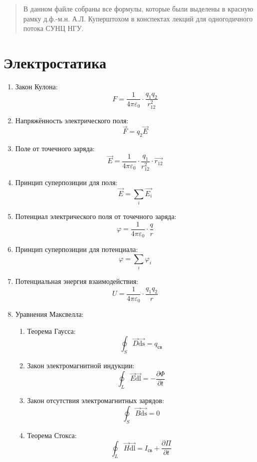 


	\maketitle
	
	\begin{abstract}
		В данном файле собраны все формулы, которые были выделены в красную рамку д.ф.-м.н. А.Л. Куперштохом в конспектах лекций для одногодичного потока СУНЦ НГУ.
	\end{abstract}
	
	\section{Электростатика}
		\begin{enumerate}
			\item Закон Кулона: \[ F = \frac{1}{4 \pi \varepsilon_0} \cdot \frac{q_{1} q_{2}}{r_{12}^2} \]
			\item Напряжённость электрического поля: \[ \overrightarrow{F} = q_2 \overrightarrow{E}\]
			\item Поле от точечного заряда: \[ \overrightarrow{E} = \frac{1}{4 \pi \varepsilon_0} \cdot \frac{q_1}{r_{12}^2} \cdot \overrightarrow{r_{12}}\]
			\item Принцип суперпозиции для поля: \[ \overrightarrow{E} = \sum_i \overrightarrow{E_i}\]
			\item Потенциал электрического поля от точечного заряда: \[ \varphi = \frac{1}{4 \pi \varepsilon_0} \cdot \frac{q}{r}\]
			\item Принцип суперпозиции для потенциала: \[\varphi = \sum_i \varphi_i\]
			\item Потенциальная энергия взаимодействия: \[U = \frac{1}{4 \pi \varepsilon_0} \cdot \frac{q_1 q_2}{r}\]
			\item Уравнения Максвелла:
				\begin{enumerate}
					\item Теорема Гаусса: \[ \oint_S \overrightarrow{D} \overrightarrow{\mathrm{ds}} = q_{св}\]
					\item Закон электромагнитной индукции: \[ \oint_L \overrightarrow{E} \overrightarrow{\mathrm{dl}} = - \frac{\partial{\Phi}}{\partial{t}} \]
					\item Закон отсутствия электромагнитных зарядов: \[ \oint_S \overrightarrow{B} \overrightarrow{\mathrm{ds}} = 0\]
					\item  Теорема Стокса: \[ \oint_L \overrightarrow{H} \overrightarrow{\mathrm{dl}} = I_{св} + \frac{\partial{\Pi}}{\partial{t}}\]

\end{enumerate}
\end{enumerate}
